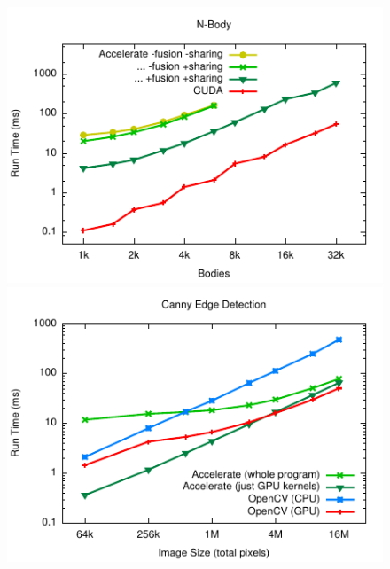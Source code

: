 \begin{figure}
\hspace{-1em}
\includegraphics[scale=1.2]{benchmarks/figs/nbody/nbody.pdf}
\includegraphics[scale=1.2]{benchmarks/figs/canny/canny.pdf}


\end{figure}
